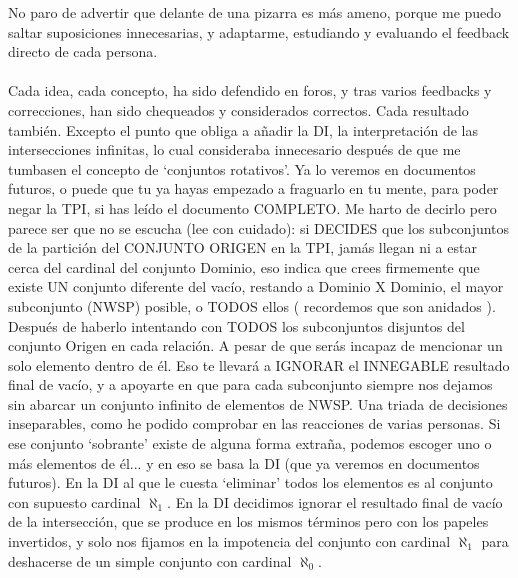 	\noindent
	No paro de advertir que delante de una pizarra es más ameno, porque me puedo saltar suposiciones innecesarias, y adaptarme, estudiando y evaluando el feedback directo de cada persona. \\\\
	
	\noindent
	Cada idea, cada concepto, ha sido defendido en foros, y tras varios feedbacks y correcciones, han sido chequeados y considerados correctos. Cada resultado también. Excepto el punto que obliga a añadir la DI, la interpretación de las intersecciones infinitas, lo cual consideraba innecesario después de que me tumbasen el concepto de `conjuntos rotativos'. Ya lo veremos en documentos futuros, o puede que tu ya hayas empezado a fraguarlo en tu mente, para poder negar la TPI, si has leído el documento COMPLETO. Me harto de decirlo pero parece ser que no se escucha (lee con cuidado): si DECIDES que los subconjuntos de la partición del CONJUNTO ORIGEN en la TPI, jamás llegan ni a estar cerca del cardinal del conjunto Dominio, eso indica que crees firmemente que existe UN conjunto diferente del vacío, restando a Dominio X Dominio, el mayor subconjunto (NWSP) posible, o TODOS ellos ( recordemos que son anidados ). Después de haberlo intentando con TODOS los subconjuntos disjuntos del conjunto Origen en cada relación. A pesar de que serás incapaz de mencionar un solo elemento dentro de él. Eso te llevará a IGNORAR el INNEGABLE resultado final de vacío, y a apoyarte en que para cada subconjunto siempre nos dejamos sin abarcar un conjunto infinito de elementos de NWSP. Una triada de decisiones inseparables, como he podido comprobar en las reacciones de varias personas. Si ese conjunto `sobrante' existe de alguna forma extraña, podemos escoger uno o más elementos de él... y en eso se basa la DI (que ya veremos en documentos futuros). En la DI al que le cuesta `eliminar' todos los elementos es al conjunto con supuesto cardinal $\aleph_{1}$. En la DI decidimos ignorar el resultado final de vacío de la intersección, que se produce en los mismos términos pero con los papeles invertidos, y solo nos fijamos en la impotencia del conjunto con cardinal $\aleph_{1}$ para deshacerse de un simple conjunto con cardinal $\aleph_{0}$.\\\\
	
